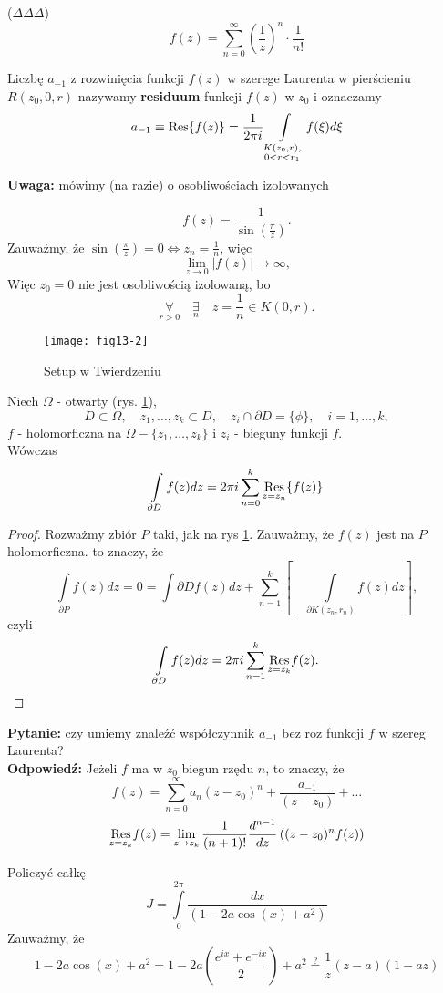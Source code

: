 \documentclass[../main.tex]{subfiles}
\begin{document}
\begin{przyklad}
    ($\Delta\Delta\Delta$)\\
    \[
        f(z) = \sum_{n = 0}^\infty \left(\frac{1}{z}\right)^n \cdot \frac{1}{n!}
    \]
\end{przyklad}
\begin{definicja}
    Liczbę $a_{-1}$ z rozwinięcia funkcji $f(z)$ w szerege Laurenta w pierścieniu $R(z_0, 0, r)$ nazywamy \textbf{residuum} funkcji $f(z)$ w $z_0$ i oznaczamy
    \[
        a_{-1} \equiv \operatorname{Res}\{f(z)\} = \frac{1}{2\pi i} \int\limits_{\substack{K(z_0,r),\\ 0<r<r_1}} f(\xi)d\xi
    \]
\end{definicja}
\textbf{Uwaga: } mówimy (na razie) o osobliwościach izolowanych
\begin{przyklad}
    \[
        f(z) = \frac{1}{\sin\left(\frac{\pi}{z}\right)}
    .\]
Zauważmy, że $\sin\left(\frac{\pi}{z}\right) = 0 \iff z_n = \frac{1}{n}$, więc
    \[
        \lim\limits_{z\to 0}|f(z)| \to \infty,
    \]
    Więc $z_0 = 0$ nie jest osobliwością izolowaną, bo
    \[
        \underset{r > 0}{\forall}\quad\underset{n}{\exists}\quad z = \frac{1}{n}\in K(0,r).
    \]
\end{przyklad}
\begin{figure}
    \centering
    \texttt{[image: fig13-2]}
    \caption{Setup w Twierdzeniu}
    \label{fig:w13-2}
\end{figure}
\begin{tw}
    Niech $\Omega$ - otwarty (rys. \ref{fig:w13-2}),
    \[
        D\subset \Omega,\quad z_1,\dots,z_k\subset D,\quad z_i\cap \partial D = \{\phi\},\quad i = 1,\dots,k
        ,\] $f$ - holomorficzna na $\Omega - \{z_1,\dots,z_k\}$ i $z_i$ - bieguny funkcji $f$.\\
Wówczas
    \[
        \int\limits_{\partial D} f(z)dz = 2 \pi i \sum_{n=0}^k \underset{z = z_n}{\operatorname{Res}}\{f(z)\}
    \]
\end{tw}
\begin{proof}
    Rozważmy zbiór $P$ taki, jak na rys \ref{fig:w13-2}.
    Zauważmy, że $f(z)$ jest na $P$ holomorficzna. to znaczy, że
    \[
        \int\limits_{\partial P}f(z) dz = 0 = \int\limits{\partial D}f(z)dz + \sum_{n=1}^k \left[\quad\int\limits_{\partial K(z_n, r_n)}f(z) dz\right],
    \]
    czyli
    \[
        \int\limits_{\partial D} f(z) dz = 2 \pi i\sum_{n=1}^k \underset{z = z_k}{\operatorname{Res}} f(z)
    .\]
\end{proof}
\textbf{Pytanie:} czy umiemy znaleźć współczynnik $a_{-1}$ bez roz funkcji $f$ w szereg Laurenta?\\
\textbf{Odpowiedź:} Jeżeli $f$ ma w $z_0$ biegun rzędu $n$, to znaczy, że
\[
    f(z) = \sum_{n=0}^\infty a_n(z-z_0)^n + \frac{a_{-1}}{(z-z_0)} + \dots
\]
\[
    \underset{z = z_k}{\operatorname{Res}}f(z) = \lim\limits_{z\to z_k} \frac{1}{(n+1)!} \frac{d^{n-1}}{dz}\left((z-z_0)^nf(z)\right)
\]
\begin{przyklad}
    Policzyć całkę
    \[
        J = \int\limits_0^{2\pi} \frac{dx}{(1-2a\cos(x)+a^2)}
    \]
    Zauważmy, że
    \[
        1 - 2a \cos(x) + a^2 = 1 - 2a\left( \frac{e^{ix} + e^{-ix}}{2}\right) + a^2 \overset{?}{=} \frac{1}{z} (z-a)(1-az)
    \]
\end{przyklad}
\end{document}
